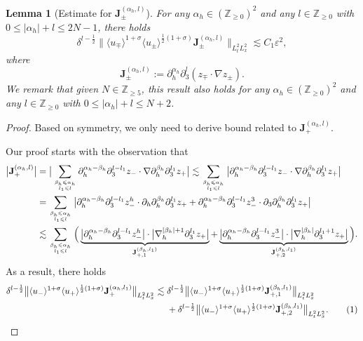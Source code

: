 \documentclass[10pt,reqno]{amsart}
\numberwithin{equation}{section}
\newtheorem{lemma}[theorem]{Lemma}
\begin{document}
\begin{lemma}[Estimate for $\mathbf{J}_\pm^{(\alpha_h,l)}$]\label{lemma2}
	For any $\alpha_h\in(\mathbb{Z}_{\geqslant 0})^2$ and any $l\in\mathbb{Z}_{\geqslant 0}$ with $0\leqslant|\alpha_h|+l\leqslant 2N-1$, 
	there holds
	\[\delta^{l-\frac{1}{2}}\big\|\langle u_\mp\rangle^{1+\sigma}\langle u_\pm\rangle^{\frac{1}{2}(1+\sigma)}\mathbf{J}_\pm^{(\alpha_h,l)}\big\|_{L^2_tL^2_x}
	\lesssim C_1\varepsilon^2,\]
	where 
	\[\mathbf{J}_\pm^{(\alpha_h,l)}:=\partial_h^{\alpha_h}\partial_3^{l}(z_\mp\cdot \nabla z_\pm).\]
	We remark that given $N\in\mathbb{Z}_{\geqslant 5}$, this result also holds for any $\alpha_h\in(\mathbb{Z}_{\geqslant 0})^2$ and any $l\in\mathbb{Z}_{\geqslant 0}$ with $0\leqslant|\alpha_h|+l\leqslant N+2$.
\end{lemma}
\begin{proof}
Based on symmetry, we only need to derive bound related to $\mathbf{J}_{+}^{(\alpha_h,l)}$. 
	
	Our proof starts with the observation that 
	\begin{align*} \big|\mathbf{J}_+^{(\alpha_h,l)}\big|
		&=\big|\sum_{\beta_h\leqslant\alpha_h\atop l_1\leqslant l}\partial_h^{\alpha_h-\beta_h}\partial_3^{l-l_1}z_-\cdot \nabla\partial_h^{\beta_h}\partial_3^{l_1} z_{+}\big|\lesssim\sum_{\beta_h\leqslant\alpha_h\atop l_1\leqslant l}\big|\partial_h^{\alpha_h-\beta_h}\partial_3^{l-l_1}z_-\cdot \nabla\partial_h^{\beta_h}\partial_3^{l_1} z_{+}\big|\\
		&
		=\sum_{\beta_h\leqslant\alpha_h\atop l_1\leqslant l}\big|\partial_h^{\alpha_h-\beta_h}\partial_3^{l-l_1}z_-^h\cdot \partial_h\partial_h^{\beta_h}\partial_3^{l_1} z_{+}+\partial_h^{\alpha_h-\beta_h}\partial_3^{l-l_1}z_-^3\cdot \partial_3\partial_h^{\beta_h}\partial_3^{l_1} z_{+}\big|\\
		&\lesssim\sum_{\beta_h\leqslant\alpha_h\atop l_1\leqslant l}\Big(\underbrace{\big|\partial_h^{\alpha_h-\beta_h}\partial_3^{l-l_1}z_-^h\big|\cdot \big|\nabla_h^{|\beta_h|+1}\partial_3^{l_1} z_{+}\big|}_{\mathbf{J}_{+,1}^{(\beta_h,l_1)}}+\underbrace{\big|\partial_h^{\alpha_h-\beta_h}\partial_3^{l-l_1}z_-^3\big|\cdot \big|\nabla_h^{|\beta_h|}\partial_3^{l_1+1} z_{+}\big|}_{\mathbf{J}_{+,2}^{(\beta_h,l_1)}}\Big).
	\end{align*}
	As a result, there holds
	\begin{align*}
		\delta^{l-\frac{1}{2}}\big\|\langle u_-\rangle^{1+\sigma}\langle u_+\rangle^{\frac{1}{2}(1+\sigma)}\mathbf{J}_+^{(\alpha_h,l_1)}\big\|_{L^2_tL^2_x}&\lesssim \delta^{l-\frac{1}{2}}\big\|\langle u_-\rangle^{1+\sigma}\langle u_+\rangle^{\frac{1}{2}(1+\sigma)}\mathbf{J}_{+,1}^{(\beta_h,l_1)}\big\|_{L^2_tL^2_x}\\
		&\ \ \ \  +\delta^{l-\frac{1}{2}}\big\|\langle u_-\rangle^{1+\sigma}\langle u_+\rangle^{\frac{1}{2}(1+\sigma)}\mathbf{J}_{+,2}^{(\beta_h,l_1)}\big\|_{L^2_tL^2_x}.\stepcounter{equation}\tag{\theequation}\label{eq:I1I2}
	\end{align*}
	

\end{proof}
\end{document}
